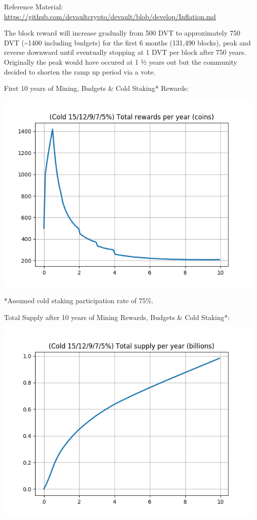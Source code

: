 {Reference Material:
}{\href{https://www.google.com/url?q=https://github.com/devaultcrypto/devault/blob/develop/ColdRewards.md\&sa=D\&ust=1574537005295000}{https://github.com/devaultcrypto/devault/blob/develop/Inflation.md}}

{}

{The block reward will increase gradually from 500 DVT to approximately
750 DVT (\textasciitilde1400 including budgets) for the first 6 months
(131,490 blocks), peak and reverse downward until eventually stopping at
1 DVT per block after 750 years. Originally the peak would have occured
at 1 ½ years out but the community decided to shorten the ramp up period
via a vote.}

{}

{First 10 years of Mining, Budgets \& Cold Staking* Rewards:}

{\includegraphics{images/image3.png}}

{*Assumed cold staking participation rate of 75\%.}

{}

{Total Supply after 10 years of Mining Rewards, Budgets \& Cold
Staking*:}

{}

{\includegraphics{images/image1.png}}

